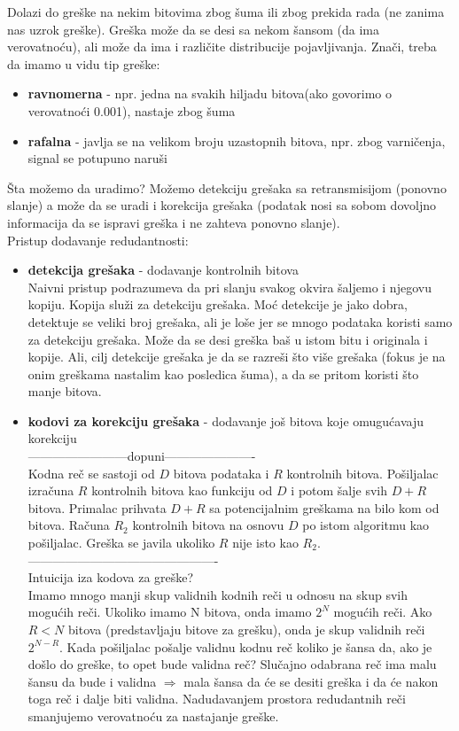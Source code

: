 \documentclass{article} %
\begin{document}
Dolazi do greške na nekim bitovima zbog šuma ili zbog prekida rada (ne zanima nas uzrok greške). Greška može da se desi sa nekom šansom (da ima verovatnoću), ali može da ima i različite distribucije pojavljivanja. Znači, treba da imamo u vidu tip greške: 
\begin{itemize}
  \item \textbf{ravnomerna}  - npr. jedna na svakih hiljadu bitova(ako govorimo o verovatnoći 0.001), nastaje zbog šuma
  \item \textbf{rafalna} - javlja se na velikom broju uzastopnih bitova, npr. zbog varničenja, signal se potupuno naruši
\end{itemize} 
Šta možemo da uradimo? Možemo detekciju grešaka sa retransmisijom (ponovno slanje) a može da se uradi i korekcija grešaka (podatak nosi sa sobom dovoljno informacija da se ispravi greška i ne zahteva ponovno slanje).\\
Pristup dodavanje redudantnosti:
\begin{itemize}
  \item \textbf{detekcija grešaka}  - dodavanje kontrolnih bitova\\
  Naivni pristup podrazumeva da pri slanju svakog okvira šaljemo i njegovu kopiju. Kopija služi za detekciju grešaka. Moć detekcije je jako dobra, detektuje se veliki broj grešaka, ali je loše jer se mnogo podataka koristi samo za detekciju grešaka. Može da se desi greška baš u istom bitu i originala i kopije. Ali, cilj detekcije grešaka je da se razreši što više grešaka (fokus je na onim greškama nastalim kao posledica šuma), a da se pritom koristi što manje bitova.
  \item \textbf{kodovi za korekciju grešaka} - dodavanje još bitova koje omugućavaju korekciju\\
  ------------------------dopuni----------------------\\
  Kodna reč se sastoji od $D$ bitova podataka i $R$ kontrolnih bitova. Pošiljalac izračuna $R$ kontrolnih bitova kao funkciju od $D$ i potom šalje svih $D+R$ bitova. Primalac prihvata $D+R$ sa potencijalnim greškama na bilo kom od bitova. Računa $R_{2}$ kontrolnih bitova na osnovu $D$ po istom algoritmu kao pošiljalac. Greška se javila ukoliko $R$ nije isto kao $R_{2}$.\\
  ----------------------------------------------\\
  Intuicija iza kodova za greške?\\
  Imamo mnogo manji skup validnih kodnih reči u odnosu na skup svih mogućih reči. Ukoliko imamo N bitova, onda imamo $2^{N}$ mogućih reči. Ako $R < N$ bitova (predstavljaju bitove za grešku), onda je skup validnih reči $2^{N-R} $. Kada pošiljalac pošalje validnu kodnu reč koliko je šansa da, ako je došlo do greške, to opet bude validna reč? Slučajno odabrana reč ima malu šansu da bude i validna $ \Rightarrow $ mala šansa da će se desiti greška i da će nakon toga reč i dalje biti validna. Nadudavanjem prostora redudantnih reči smanjujemo verovatnoću za nastajanje greške.
\end{itemize} 
\end{document}
